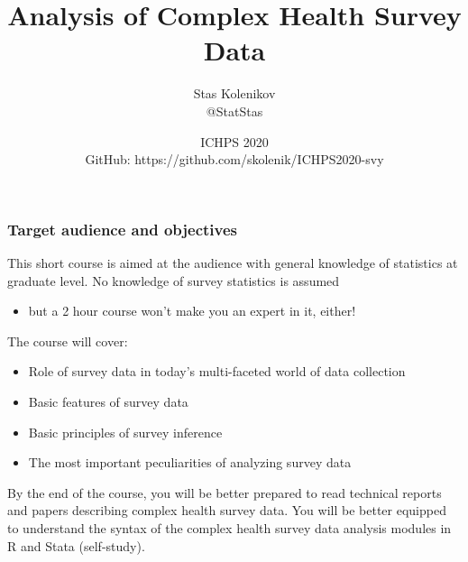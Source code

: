 \documentclass{beamer}
\begin{document}
\title{\textbf{Analysis of Complex Health Survey Data}}
\author[Stas Kolenikov]{Stas Kolenikov \\ @StatStas}
\date[ICHPS 2020]{ICHPS 2020
 \medskip \\ GitHub: https://github.com/skolenik/ICHPS2020-svy }




\begin{frame}
    \titlepage
\end{frame}

\begin{frame}\frametitle{Target audience and objectives}

This short course is aimed at the audience with general knowledge of statistics
at graduate level. No knowledge of survey statistics is assumed
\begin{itemize}
    \item but a 2 hour course won't make you an expert in it, either!
\end{itemize}

The course will cover:
\begin{itemize}
    \item Role of survey data in today's multi-faceted world of data collection
    \item Basic features of survey data
    \item Basic principles of survey inference
    \item The most important peculiarities of analyzing survey data
\end{itemize}

By the end of the course, you will be better prepared to read technical reports
and papers describing complex health survey data. You will be better equipped to
understand the syntax of the complex health survey data analysis modules
in R and Stata (self-study).

\end{frame}
\end{document}
